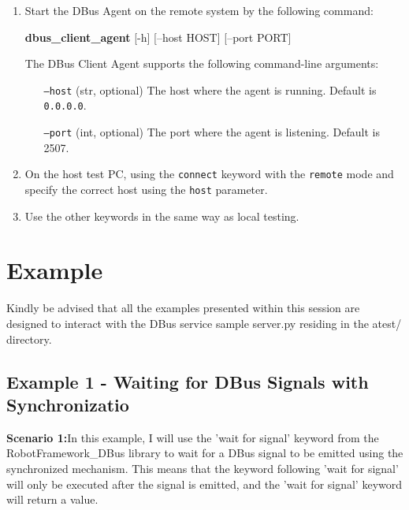 \begin{enumerate}
    \item Start the DBus Agent on the remote system by the following command:
	
		\textbf{dbus\_client\_agent} [-h] [--host HOST] [--port PORT]
		
		The DBus Client Agent supports the following command-line arguments:

		\begin{itemize}
			\setlength{\itemindent}{10em}
			\item [\texttt{--host} (str, optional)] The host where the agent is running. Default is \texttt{0.0.0.0}.
			\item [\texttt{--port} (int, optional)] The port where the agent is listening. Default is 2507.
		\end{itemize}

	
    \item On the host test PC, using the \texttt{connect} keyword with the \texttt{remote} mode and specify the correct host using the \texttt{host} parameter.
    \item Use the other keywords in the same way as local testing.
\end{enumerate}


\hypertarget{example}{%
\section{Example}\label{example}}


Kindly be advised that all the examples presented within this session are designed to interact with the DBus service sample server.py residing in the atest/ directory.

\hypertarget{description-example1}{%
\subsection{\texorpdfstring{\textbf{Example 1 - Waiting for DBus Signals with Synchronizatio}}{Example 1 - Waiting for DBus Signals with Synchronizatio}}\label{description-example1}}

\textbf{Scenario 1:}In this example, I will use the 'wait for signal' keyword from the RobotFramework\_DBus library to wait for a DBus signal to be emitted using the synchronized mechanism. 
This means that the keyword following 'wait for signal' will only be executed after the signal is emitted, and the 'wait for signal' keyword will return a value.


